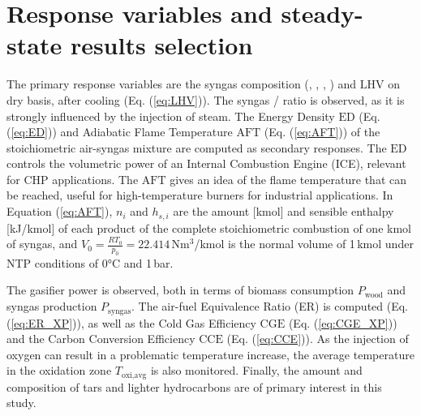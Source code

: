 
\section{Response variables and steady-state results selection}

The primary response variables are the syngas composition (, , , ) and $\mathrm{LHV}$ on dry basis, after cooling (Eq. (\ref{eq:LHV})). The syngas / ratio is observed, as it is strongly influenced by the injection of steam. The Energy Density $\mathrm{ED}$ (Eq. (\ref{eq:ED})) and Adiabatic Flame Temperature $\mathrm{AFT}$ (Eq. (\ref{eq:AFT})) of the stoichiometric air-syngas mixture are computed as secondary responses. The $\mathrm{ED}$ controls the volumetric power of an Internal Combustion Engine (ICE), relevant for CHP applications. The $\mathrm{AFT}$ gives an idea of the flame temperature that can be reached, useful for high-temperature burners for industrial applications. In Equation (\ref{eq:AFT}), $n_i$ and $h_{s,i}$ are the amount [kmol] and sensible enthalpy [kJ/kmol] of each product of the complete stoichiometric combustion of one kmol of syngas, and $V_0=\frac{RT_0}{p_0}=22.414$\,Nm$^3$/kmol is the normal volume of 1\,kmol under NTP conditions of 0°C and 1\,bar.

The gasifier power is observed, both in terms of biomass consumption $P_\text{wood}$ and syngas production $P_\text{syngas}$. The air-fuel Equivalence Ratio (ER) is computed (Eq. (\ref{eq:ER_XP})), as well as the Cold Gas Efficiency $\mathrm{CGE}$ (Eq. (\ref{eq:CGE_XP})) and the Carbon Conversion Efficiency $\mathrm{CCE}$ (Eq. (\ref{eq:CCE})). As the injection of oxygen can result in a problematic temperature increase, the average temperature in the oxidation zone $T_\text{oxi,avg}$ is also monitored. Finally, the amount and composition of tars and lighter hydrocarbons are of primary interest in this study.


